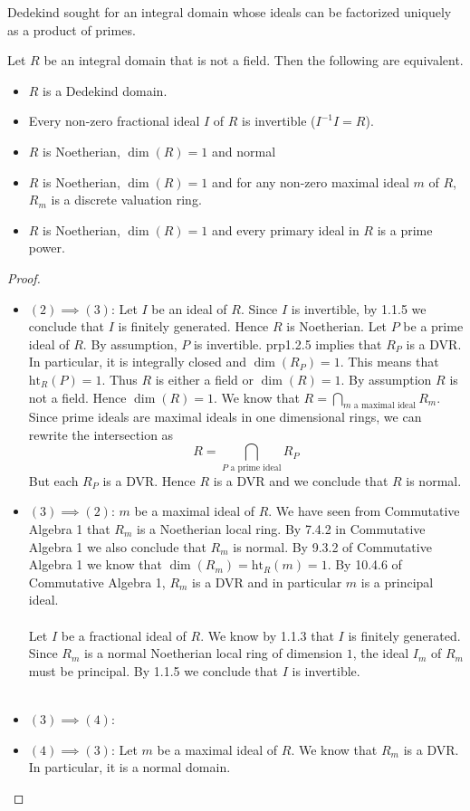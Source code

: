 \documentclass[a4paper]{article}
\begin{document}
Dedekind sought for an integral domain whose ideals can be factorized uniquely as a product of primes. 

\begin{prp}{}{} Let $R$ be an integral domain that is not a field. Then the following are equivalent. 
\begin{itemize}
\item $R$ is a Dedekind domain. 
\item Every non-zero fractional ideal $I$ of $R$ is invertible ($I^{-1}I=R$). 
\item $R$ is Noetherian, $\dim(R)=1$ and normal
\item $R$ is Noetherian, $\dim(R)=1$ and for any non-zero maximal ideal $m$ of $R$, $R_m$ is a discrete valuation ring. 
\item $R$ is Noetherian, $\dim(R)=1$ and every primary ideal in $R$ is a prime power. 
\end{itemize} \tcbline
\begin{proof}~\\
\begin{itemize}
\item $(2)\implies(3)$: Let $I$ be an ideal of $R$. Since $I$ is invertible, by 1.1.5 we conclude that $I$ is finitely generated. Hence $R$ is Noetherian. Let $P$ be a prime ideal of $R$. By assumption, $P$ is invertible. prp1.2.5 implies that $R_P$ is a DVR. In particular, it is integrally closed and $\dim(R_P)=1$. This means that $\text{ht}_R(P)=1$. Thus $R$ is either a field or $\dim(R)=1$. By assumption $R$ is not a field. Hence $\dim(R)=1$. We know that $R=\bigcap_{m\text{ a maximal ideal}}R_m$. Since prime ideals are maximal ideals in one dimensional rings, we can rewrite the intersection as $$R=\bigcap_{P\text{ a prime ideal}}R_P$$ But each $R_P$ is a DVR. Hence $R$ is a DVR and we conclude that $R$ is normal. 

\item $(3)\implies(2)$:  $m$ be a maximal ideal of $R$. We have seen from Commutative Algebra 1 that $R_m$ is a Noetherian local ring. By 7.4.2 in Commutative Algebra 1 we also conclude that $R_m$ is normal. By 9.3.2 of Commutative Algebra 1 we know that $\dim(R_m)=\text{ht}_R(m)=1$. By 10.4.6 of Commutative Algebra 1, $R_m$ is a DVR and in particular $m$ is a principal ideal. \\~\\

Let $I$ be a fractional ideal of $R$. We know by 1.1.3 that $I$ is finitely generated. Since $R_m$ is a normal Noetherian local ring of dimension $1$, the ideal $I_m$ of $R_m$ must be principal. By 1.1.5 we conclude that $I$ is invertible. \\~\\

\item $(3)\implies(4)$: 

\item $(4)\implies(3)$: Let $m$ be a maximal ideal of $R$. We know that $R_m$ is a DVR. In particular, it is a normal domain. 
\end{itemize}
\end{proof}
\end{prp}
\end{document}
